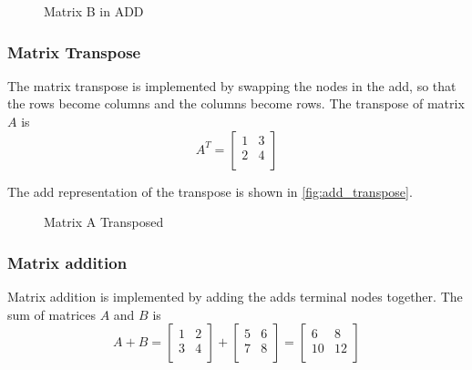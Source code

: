 \begin{figure}
    \centering
    \caption{Matrix B in ADD}
    \label{fig:add_matrix_b}
\end{figure}

\subsubsection{Matrix Transpose}
The matrix transpose is implemented by swapping the nodes in the \gls{add}, so that the rows become columns and the columns become rows.
The transpose of matrix $A$ is
\[
    A^T = \begin{bmatrix}
              1 & 3 \\
              2 & 4 \\
    \end{bmatrix}
\]

The \gls{add} representation of the transpose is shown in \autoref{fig:add_transpose}.
\begin{figure}
    \centering
    
    \caption{Matrix A Transposed}
    \label{fig:add_transpose}
\end{figure}

\subsubsection{Matrix addition}
Matrix addition is implemented by adding the \glspl{add} terminal nodes together.
The sum of matrices $A$ and $B$ is
\[
    A + B = \begin{bmatrix}
                1 & 2 \\
                3 & 4 \\
    \end{bmatrix} + \begin{bmatrix}
                        5 & 6 \\
                        7 & 8 \\
    \end{bmatrix} = \begin{bmatrix}
                        6  & 8  \\
                        10 & 12 \\
    \end{bmatrix}
\]

